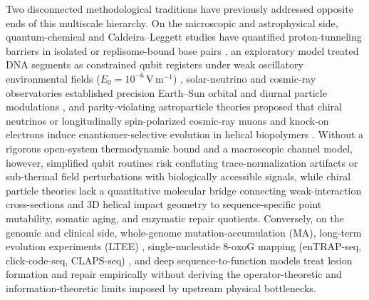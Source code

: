 \documentclass[10pt,letterpaper]{article}
\theoremstyle{plain}
\theoremstyle{definition}
\newcommand{\oxog}{\text{8-oxoG}}
\begin{document}
Two disconnected methodological traditions have previously addressed opposite ends of this multiscale hierarchy. On the microscopic and astrophysical side, quantum-chemical and Caldeira--Leggett studies have quantified proton-tunneling barriers in isolated or replisome-bound base pairs \cite{slocombe2021pccp,slocombe2022commchem,winokan2023scirep}, an exploratory model treated DNA segments as constrained qubit registers under weak oscillatory environmental fields ($E_0 = 10^{-6}\,\mathrm{V\,m^{-1}}$) \cite{garcia2026dna}, solar-neutrino and cosmic-ray observatories established precision Earth--Sun orbital and diurnal particle modulations \cite{appel2022borexino,abbasi2010icecube,wang2025aps,gaisser2019icrc,malgin2015jetp}, and parity-violating astroparticle theories proposed that chiral neutrinos or longitudinally spin-polarized cosmic-ray muons and knock-on electrons induce enantiomer-selective evolution in helical biopolymers \cite{globus2020apjl,globus2021apj,globus2021muons,ozturk2022pnas,ozturk2023sciadv,valkovic2022aj,jannat2026neutrinos}. Without a rigorous open-system thermodynamic bound and a macroscopic channel model, however, simplified qubit routines risk conflating trace-normalization artifacts or sub-thermal field perturbations with biologically accessible signals, while chiral particle theories lack a quantitative molecular bridge connecting weak-interaction cross-sections and 3D helical impact geometry to sequence-specific point mutability, somatic aging, and enzymatic repair quotients. Conversely, on the genomic and clinical side, whole-genome mutation-accumulation (MA), long-term evolution experiments (LTEE) \cite{lee2012pnas,tenaillon2016nature,foster2018genetics,maddamsetti2020gbe}, single-nucleotide $\oxog$ mapping (enTRAP-seq, click-code-seq, CLAPS-seq) \cite{fang2019biochem,xiao2023chemcomm,li2025nar,takhaveev2025natchembio}, and deep sequence-to-function models \cite{otlu2023celrep} treat lesion formation and repair empirically without deriving the operator-theoretic and information-theoretic limits imposed by upstream physical bottlenecks.
\end{document}
